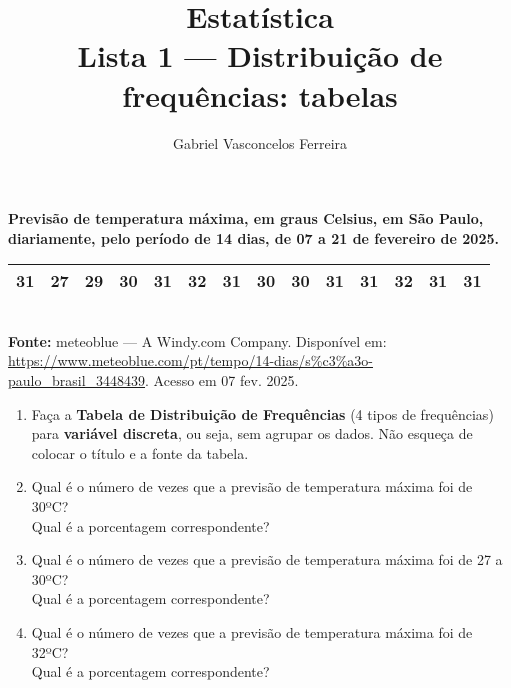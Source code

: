 \documentclass{jhwhw}
\begin{document}
\author{Gabriel Vasconcelos Ferreira}
\title{%
	Estatística\\Lista 1 --- Distribuição de frequências: tabelas
}
\maketitle
{}
\begin{center}
	\textbf{Previsão de temperatura máxima, em graus Celsius, em São Paulo, diariamente, pelo período de 14 dias, de 07 a 21 de fevereiro de 2025.}
	\begin{tabular}{llllllllllllll}
		\hline 31 & 27 & 29 & 30 & 31 & 32 & 31 & 30 & 30 & 31 & 31 & 32 & 31 & 31 \\
		\hline
	\end{tabular}\\
	\textbf{Fonte:} meteoblue --- A Windy.com Company. Disponível em: \url{https://www.meteoblue.com/pt/tempo/14-dias/s\%c3\%a3o-paulo\_brasil\_3448439}. Acesso em 07 fev. 2025.
\end{center}
\begin{enumerate}[label=\alph*)]
	\item Faça a \textbf{Tabela de Distribuição de Frequências} (4 tipos de frequências) para \textbf{variável discreta}, ou seja, sem agrupar os dados. Não esqueça de colocar o título e a fonte da tabela.
	\item Qual é o número de vezes que a previsão de temperatura máxima foi de 30ºC?\\Qual é a porcentagem correspondente?
	\item Qual é o número de vezes que a previsão de temperatura máxima foi de 27 a 30ºC?\\Qual é a porcentagem correspondente?
	\item Qual é o número de vezes que a previsão de temperatura máxima foi de 32ºC?\\Qual é a porcentagem correspondente?
\end{enumerate}
\end{document}
